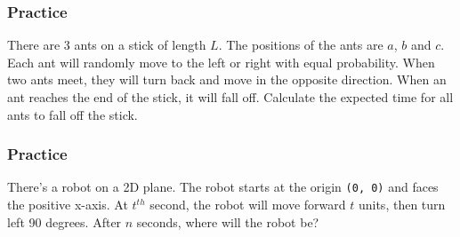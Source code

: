 \documentclass[xcolor=dvipsnames]{beamer}
\begin{document}
    \begin{frame}
        \frametitle{Practice}
        There are 3 ants on a stick of length $L$.
        The positions of the ants are $a$, $b$ and $c$.
        Each ant will randomly move to the left or right with equal probability.
        When two ants meet, they will turn back and move in the opposite direction.
        When an ant reaches the end of the stick, it will fall off.
        Calculate the expected time for all ants to fall off the stick.
    \end{frame}
    \begin{frame}
        \frametitle{Practice}
        There's a robot on a 2D plane.
        The robot starts at the origin \texttt{(0, 0)} and faces the positive x-axis.
        At $t^{th}$ second, the robot will move forward $t$ units, then turn left 90 degrees.
        After $n$ seconds, where will the robot be?
    \end{frame}
\end{document}
